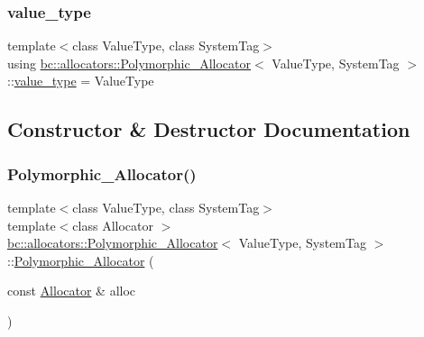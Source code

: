 \subsubsection{\texorpdfstring{value\+\_\+type}{value\_type}}
{\footnotesize\ttfamily template$<$class Value\+Type, class System\+Tag$>$ \\
using \hyperlink{structbc_1_1allocators_1_1Polymorphic__Allocator}{bc\+::allocators\+::\+Polymorphic\+\_\+\+Allocator}$<$ Value\+Type, System\+Tag $>$\+::\hyperlink{structbc_1_1allocators_1_1Polymorphic__Allocator_a2655c4bc3c86364c42aa20639a1b7a44}{value\+\_\+type} =  Value\+Type}



\subsection{Constructor \& Destructor Documentation}
\mbox{\label{structbc_1_1allocators_1_1Polymorphic__Allocator_a5a51c02d87ee89f98ed1a192e1a7fc31}} 
\subsubsection{\texorpdfstring{Polymorphic\+\_\+\+Allocator()}{Polymorphic\_Allocator()}\hspace{0.1cm}{\footnotesize\ttfamily [1/3]}}
{\footnotesize\ttfamily template$<$class Value\+Type, class System\+Tag$>$ \\
template$<$class Allocator $>$ \\
\hyperlink{structbc_1_1allocators_1_1Polymorphic__Allocator}{bc\+::allocators\+::\+Polymorphic\+\_\+\+Allocator}$<$ Value\+Type, System\+Tag $>$\+::\hyperlink{structbc_1_1allocators_1_1Polymorphic__Allocator}{Polymorphic\+\_\+\+Allocator} (\begin{DoxyParamCaption}\item[{const \hyperlink{classbc_1_1allocators_1_1Allocator}{Allocator} \&}]{alloc }\end{DoxyParamCaption})\hspace{0.3cm}{\ttfamily [inline]}}

\mbox{\label{structbc_1_1allocators_1_1Polymorphic__Allocator_a85b994bea749c2177e0d9701b80c04e7}} 
